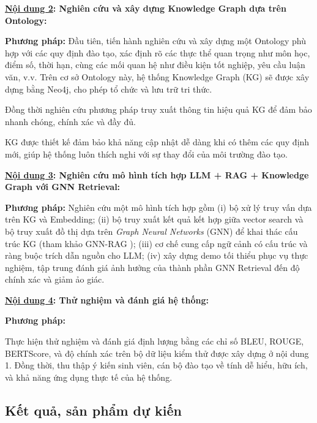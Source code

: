 \documentclass[a4paper,12pt]{article}
\begin{document}
\textbf{\uline{Nội dung 2}: Nghiên cứu và xây dựng Knowledge Graph dựa trên Ontology:}

\textbf{Phương pháp:} Đầu tiên, tiến hành nghiên cứu và xây dựng một Ontology phù hợp với các quy định đào tạo, xác định rõ các thực thể quan trọng như môn học, điểm số, thời hạn, cùng các mối quan hệ như điều kiện tốt nghiệp, yêu cầu luận văn, v.v. Trên cơ sở Ontology này, hệ thống Knowledge Graph (KG) sẽ được xây dựng bằng Neo4j, cho phép tổ chức và lưu trữ tri thức. 

Đồng thời nghiên cứu phương pháp truy xuất thông tin hiệu quả KG để đảm bảo nhanh chóng, chính xác và đầy đủ.

KG được thiết kế đảm bảo khả năng cập nhật dễ dàng khi có thêm các quy định mới, giúp hệ thống luôn thích nghi với sự thay đổi của môi trường đào tạo.
    
\textbf{\uline{Nội dung 3}: Nghiên cứu mô hình tích hợp LLM + RAG + Knowledge Graph với GNN Retrieval:}

\textbf{Phương pháp:} Nghiên cứu một mô hình tích hợp gồm (i) bộ xử lý truy vấn dựa trên KG và Embedding; (ii) bộ truy xuất kết quả kết hợp giữa vector search và bộ truy xuất đồ thị dựa trên \emph{Graph Neural Networks} (GNN) để khai thác cấu trúc KG (tham khảo GNN-RAG \cite{GNN_RAG}); (iii) cơ chế cung cấp ngữ cảnh có cấu trúc và ràng buộc trích dẫn nguồn cho LLM; (iv) xây dựng demo tối thiểu phục vụ thực nghiệm, tập trung đánh giá ảnh hưởng của thành phần GNN Retrieval đến độ chính xác và giảm ảo giác.

\textbf{\uline{Nội dung 4}: Thử nghiệm và đánh giá hệ thống:}

\textbf{Phương pháp:} 

Thực hiện thử nghiệm và đánh giá định lượng bằng các chỉ số BLEU, ROUGE, BERTScore, và độ chính xác trên bộ dữ liệu kiểm thử được xây dựng ở nội dung 1.
Đồng thời, thu thập ý kiến sinh viên, cán bộ đào tạo về tính dễ hiểu, hữu ích, và khả năng ứng dụng thực tế của hệ thống.

\subsection{Kết quả, sản phẩm dự kiến}
\end{document}
